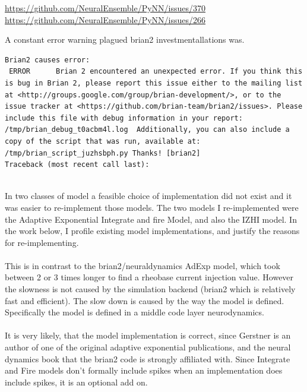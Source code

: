 

\url{https://github.com/NeuralEnsemble/PyNN/issues/370} 
\url{https://github.com/NeuralEnsemble/PyNN/issues/266} 
 
A constant error warning plagued brian2 investmentallations was.
\begin{verbatim}
Brian2 causes error:
 ERROR      Brian 2 encountered an unexpected error. If you think this is bug in Brian 2, please report this issue either to the mailing list at <http://groups.google.com/group/brian-development/>, or to the issue tracker at <https://github.com/brian-team/brian2/issues>. Please include this file with debug information in your report: /tmp/brian_debug_t0acbm4l.log  Additionally, you can also include a copy of the script that was run, available at: /tmp/brian_script_juzhsbph.py Thanks! [brian2]
Traceback (most recent call last):
\end{verbatim}
\\
In two classes of model a feasible choice of implementation did not exist and it was easier to re-implement those models. The two models I re-implemented were
the Adaptive Exponential Integrate and fire Model, and also the IZHI
model.  In the work below, I profile existing model implementations, and
justify the reasons for re-implementing.\\
\\
This is in contrast to the brian2/neuraldynamics AdExp model, which took
between 2 or 3 times longer to find a rheobase current injection value. However the slowness is not caused by the simulation backend (brian2 which is relatively fast and efficient). The slow down is caused by the way the model is defined. Specifically the
model is defined in a middle code layer neurodynamics\cite{gerstner2014neuronal}.\\
\\
It is very likely, that the model implementation is correct, since Gerstner is an author of one of the original adaptive exponential publications, and the neural dynamics book that the brian2 code is strongly affiliated with. Since Integrate and Fire models don't formally include spikes when an implementation does include spikes, it is an optional add on.\\
